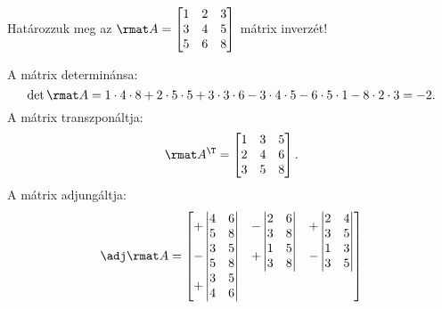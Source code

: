 \documentclass[a4paper, 12pt]{scrartcl}
\begin{document}
\begin{example}
  Határozzuk meg az $\rmat A = \begin{bmatrix}
      1 & 2 & 3 \\
      3 & 4 & 5 \\
      5 & 6 & 8 \\
    \end{bmatrix}$ mátrix inverzét!

  A mátrix determinánsa:
  $$
    \det \rmat A
    = 1 \cdot 4 \cdot 8
    + 2 \cdot 5 \cdot 5
    + 3 \cdot 3 \cdot 6
    - 3 \cdot 4 \cdot 5
    - 6 \cdot 5 \cdot 1
    - 8 \cdot 2 \cdot 3
    = -2
    \text.
  $$
  A mátrix transzponáltja:
  $$
    \rmat A^\T = \begin{bmatrix}
      1 & 3 & 5 \\
      2 & 4 & 6 \\
      3 & 5 & 8
    \end{bmatrix}
    \text.
  $$
  A mátrix adjungáltja:
  $$
    \adj \rmat A = \begin{bmatrix}
      + \begin{vmatrix}
          4 & 6 \\
          5 & 8
        \end{vmatrix}
       &
      - \begin{vmatrix}
          2 & 6 \\
          3 & 8
        \end{vmatrix}
       &
      + \begin{vmatrix}
          2 & 4 \\
          3 & 5
        \end{vmatrix}
      \\
      - \begin{vmatrix}
          3 & 5 \\
          5 & 8
        \end{vmatrix}
       &
      + \begin{vmatrix}
          1 & 5 \\
          3 & 8
        \end{vmatrix}
       &
      - \begin{vmatrix}
          1 & 3 \\
          3 & 5
        \end{vmatrix}
      \\
      + \begin{vmatrix}
          3 & 5 \\
          4 & 6
        \end{vmatrix}

\end{bmatrix}$$
\end{example}
\end{document}
